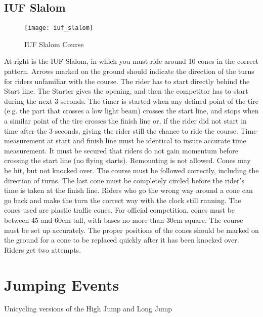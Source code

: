 \subsection{IUF Slalom}
\begin{figure}[h]
\begin{center}
\texttt{[image: iuf\_slalom]}
\end{center}
\vspace{-20pt}
\caption{IUF Slalom Course \label{fig:iuf_slalom}}
\vspace{-10pt}
\end{figure}
At right is the IUF Slalom, in which you must ride around 10 cones in the correct pattern.
Arrows marked on the ground should indicate the direction of the turns for riders unfamiliar with the course.
The rider has to start directly behind the Start line.
The Starter gives the opening, and then the competitor has to start during the next 3 seconds.
The timer is started when any defined point of the tire (e.g. the part that crosses a low light beam) crosses the start line, and stops when a similar point of the tire crosses the finish line or, if the rider did not start in time after the 3 seconds, giving the rider still the chance to ride the course.
Time measurement at start and finish line must be identical to insure accurate time measurement.
It must be secured that riders do not gain momentum before crossing the start line (no flying starts).
Remounting is not allowed. 
Cones may be hit, but not knocked over.
The course must be followed correctly, including the direction of turns.
The last cone must be completely circled before the rider's time is taken at the finish line.
Riders who go the wrong way around a cone can go back and make the turn the correct way with the clock still running.
The cones used are plastic traffic cones.
For official competition, cones must be between 45 and 60cm tall, with bases no more than 30cm square.
The course must be set up accurately.
The proper positions of the cones should be marked on the ground for a cone to be replaced quickly after it has been knocked over.
Riders get two attempts.

\section{Jumping Events \label{sec:racing_jumping-events}}
Unicycling versions of the High Jump and Long Jump 
